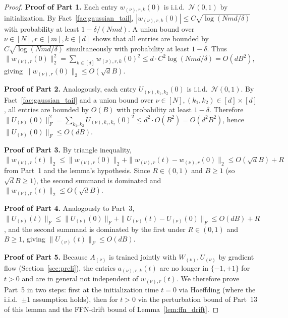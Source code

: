 \documentclass[11pt]{article}
\theoremstyle{plain}
\begin{document}
\begin{proof}
    {\bf Proof of Part 1.} Each entry $w_{(\nu),r,k}(0)$ is i.i.d.\ $\mathcal{N}(0,1)$ by initialization. By Fact~\ref{fac:gaussian_tail}, $|w_{(\nu),r,k}(0)| \le C\sqrt{\log(Nmd/\delta)}$ with probability at least $1 - \delta/(Nmd)$. A union bound over $\nu\in[N], r\in[m], k\in[d]$ shows that all entries are bounded by $C\sqrt{\log(Nmd/\delta)}$ simultaneously with probability at least $1-\delta$. Thus $\|w_{(\nu),r}(0)\|_2^2 = \sum_{k\in[d]} w_{(\nu),r,k}(0)^2 \le d \cdot C^2\log(Nmd/\delta) = O(d B^2)$, giving $\|w_{(\nu),r}(0)\|_2 \le O(\sqrt d B)$.

    {\bf Proof of Part 2.} Analogously, each entry $U_{(\nu),k_1,k_2}(0)$ is i.i.d.\ $\mathcal{N}(0,1)$. By Fact~\ref{fac:gaussian_tail} and a union bound over $\nu\in[N], (k_1,k_2)\in[d]\times[d]$, all entries are bounded by $O(B)$ with probability at least $1-\delta$. Therefore $\|U_{(\nu)}(0)\|_F^2 = \sum_{k_1,k_2} U_{(\nu),k_1,k_2}(0)^2 \le d^2\cdot O(B^2) = O(d^2 B^2)$, hence $\|U_{(\nu)}(0)\|_F \le O(dB)$.

    {\bf Proof of Part 3.} By triangle inequality, $\|w_{(\nu),r}(t)\|_2 \le \|w_{(\nu),r}(0)\|_2 + \|w_{(\nu),r}(t)-w_{(\nu),r}(0)\|_2 \le O(\sqrt dB) + R$ from Part~1 and the lemma's hypothesis. Since $R \in (0,1)$ and $B\ge 1$ (so $\sqrt d B\ge 1$), the second summand is dominated and $\|w_{(\nu),r}(t)\|_2 \le O(\sqrt d B)$.

    {\bf Proof of Part 4.} Analogously to Part~3, $\|U_{(\nu)}(t)\|_F \le \|U_{(\nu)}(0)\|_F + \|U_{(\nu)}(t)-U_{(\nu)}(0)\|_F \le O(dB) + R$, and the second summand is dominated by the first under $R\in(0,1)$ and $B\ge 1$, giving $\|U_{(\nu)}(t)\|_F \le O(dB)$.

    {\bf Proof of Part 5.} Because $A_{(\nu)}$ is trained jointly with $W_{(\nu)},U_{(\nu)}$ by gradient flow (Section~\ref{sec:preli}), the entries $a_{(\nu),r,k}(t)$ are no longer in $\{-1,+1\}$ for $t>0$ and are in general not independent of $w_{(\nu),r}(t)$. We therefore prove Part~5 in two steps: first at the initialization time $t=0$ via Hoeffding (where the i.i.d.\ $\pm 1$ assumption holds), then for $t>0$ via the perturbation bound of Part~13 of this lemma and the FFN-drift bound of Lemma~\ref{lem:ffn_drift}.


\end{proof}
\end{document}
